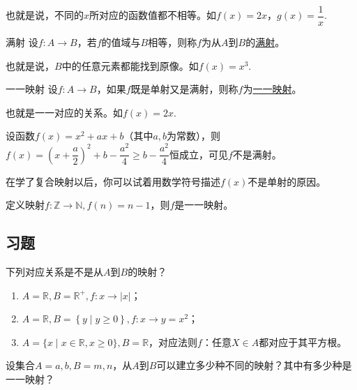 \documentclass[lang=cn,math=cm,chinesefont=nofont,11pt,scheme=chinese,twocol]{elegantbook}
\begin{document}
也就是说，不同的$x$所对应的函数值都不相等。如$f(x)=2x$，$g(x)=\dfrac{1}{x}$.

\begin{definition}{满射}
  设$f:A\rightarrow B$，若$f$的值域与$B$相等，则称$f$为从$A$到$B$的\underline{满射}。
\end{definition}

也就是说，$B$中的任意元素都能找到原像。如$f(x)=x^3$.

\begin{definition}{一一映射}
  设$f:A\rightarrow B$，如果$f$既是单射又是满射，则称$f$为\underline{一一映射}。
\end{definition}

也就是一一对应的关系。如$f(x)=2x$.

\begin{example}
  设函数$f(x)=x^2+ax+b$（其中$a,b$为常数），则$f(x)=(x+\dfrac{a}{2})^2+b-\dfrac{a^2}{4}\geqslant b-\dfrac{a^2}{4}$恒成立，可见$f$不是满射。

  在学了复合映射以后，你可以试着用数学符号描述$f(x)$不是单射的原因。
\end{example}

\begin{example}
  定义映射$f:\mathbb{Z}\rightarrow\mathbb{N},f(n)=n-1$，则$f$是一一映射。
\end{example}

\subsection{习题}

\begin{exercise}\label{HS2FZ_lkb1_P34_exp.4,BJSZ_Algebra1_P40}
  下列对应关系是不是从$A$到$B$的映射？
\end{exercise}

\begin{enumerate}
  \item $A=\mathbb{R},B=\mathbb{R}^{+},f:x\rightarrow\left|x\right|$；
  \item $A=\mathbb{R},B=\left\{y\mid y\geqslant 0\right\},f:x\rightarrow y=x^2$；
  \item $A=\{x\mid x\in\mathbb{R},x\geqslant0\},B=\mathbb{R}$，对应法则$f$：任意$X\in A$都对应于其平方根。
\end{enumerate}

\begin{exercise}
  设集合$A={a,b},B={m,n}$，从$A$到$B$可以建立多少种不同的映射？其中有多少种是一一映射？
\end{exercise}
\end{document}
